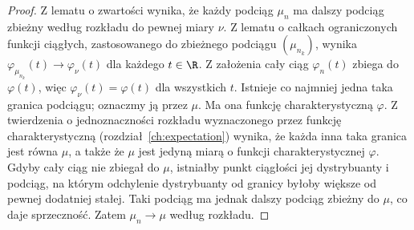 \begin{proof}
Z lematu o zwartości wynika, że każdy podciąg $\mu_n$
ma dalszy podciąg zbieżny według rozkładu do pewnej
miary $\nu$. Z lematu o całkach ograniczonych funkcji ciągłych,
zastosowanego do zbieżnego podciągu $(\mu_{n_k})$,
wynika $\varphi_{\mu_{n_k}}(t)\to\varphi_\nu(t)$
dla każdego $t\in\R$. Z założenia cały ciąg
$\varphi_n(t)$ zbiega do $\varphi(t)$, więc
$\varphi_\nu(t)=\varphi(t)$ dla wszystkich $t$.
Istnieje co najmniej jedna taka granica podciągu;
oznaczmy ją przez $\mu$. Ma ona funkcję charakterystyczną
$\varphi$. Z twierdzenia o jednoznaczności rozkładu
wyznaczonego przez funkcję charakterystyczną
(rozdział~\ref{ch:expectation}) wynika, że każda inna
taka granica jest równa $\mu$, a także że $\mu$ jest
jedyną miarą o funkcji charakterystycznej $\varphi$. Gdyby cały ciąg nie zbiegał do
$\mu$, istniałby punkt ciągłości jej dystrybuanty
i podciąg, na którym odchylenie dystrybuanty od granicy
byłoby większe od pewnej dodatniej stałej. Taki podciąg
ma jednak dalszy podciąg zbieżny do $\mu$, co daje
sprzeczność. Zatem $\mu_n\to\mu$ według rozkładu.
\end{proof}

